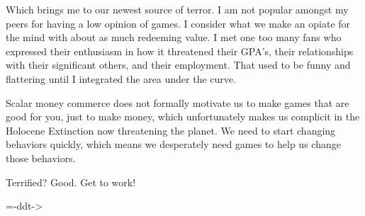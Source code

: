 \par
Which brings me to our newest source of terror.  I am not popular amongst my peers for having a low opinion of games.  I consider what we make an opiate for the mind with about as much redeeming value.  I met one too many \doom{} fans who expressed their enthusiasm in how it threatened their GPA's, their relationships with their significant others, and their employment.  That used to be funny and flattering until I integrated the area under the curve.\\
\par
Scalar money commerce does not formally motivate us to make games that are good for you, just to make money, which unfortunately makes us complicit in the Holocene Extinction now threatening the planet.  We need to start changing behaviors quickly, which means we desperately need games to help us change those behaviors.\\
\par
Terrified?  Good.  Get to work!\\
\par
        =-ddt->\\
\thispagestyle{plain} %
